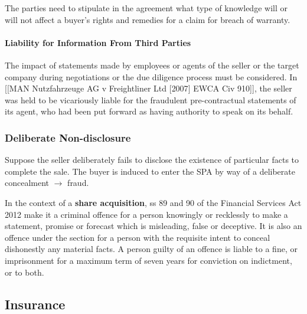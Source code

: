 \documentclass[
]{article}
\newenvironment{Shaded}{}{}
\newcommand{\NormalTok}[1]{#1}
\begin{document}
\begin{Shaded}
\begin{Highlighting}[]
\NormalTok{The parties need to stipulate in the agreement what type of knowledge will or will not affect a buyer’s rights and remedies for a claim for breach of warranty.}
\end{Highlighting}
\end{Shaded}

\hypertarget{liability-for-information-from-third-parties}{%
\paragraph{Liability for Information From Third
Parties}\label{liability-for-information-from-third-parties}}

The impact of statements made by employees or agents of the seller or
the target company during negotiations or the due diligence process must
be considered. In {[}{[}MAN Nutzfahrzeuge AG v Freightliner Ltd
{[}2007{]} EWCA Civ 910{]}{]}, the seller was held to be vicariously
liable for the fraudulent pre-contractual statements of its agent, who
had been put forward as having authority to speak on its behalf.

\hypertarget{deliberate-non-disclosure}{%
\subsubsection{Deliberate
Non-disclosure}\label{deliberate-non-disclosure}}

Suppose the seller deliberately fails to disclose the existence of
particular facts to complete the sale. The buyer is induced to enter the
SPA by way of a deliberate concealment \(\rightarrow\) fraud.

In the context of a \textbf{share acquisition}, ss 89 and 90 of the
Financial Services Act 2012 make it a criminal offence for a person
knowingly or recklessly to make a statement, promise or forecast which
is misleading, false or deceptive. It is also an offence under the
section for a person with the requisite intent to conceal dishonestly
any material facts. A person guilty of an offence is liable to a fine,
or imprisonment for a maximum term of seven years for conviction on
indictment, or to both.

\hypertarget{insurance-1}{%
\subsection{Insurance}\label{insurance-1}}
\end{document}

